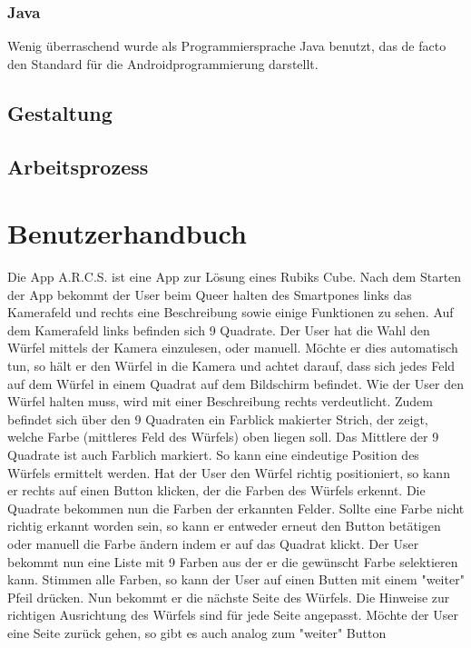 \subsubsection{Java}  %

Wenig überraschend wurde als Programmiersprache Java benutzt, das de facto den
Standard für die Androidprogrammierung darstellt.

\subsection{Gestaltung}  %
\subsection{Arbeitsprozess}  %

\section{Benutzerhandbuch}  %
Die App A.R.C.S. ist eine App zur Lösung eines Rubiks Cube.
Nach dem Starten der App bekommt der User beim Queer halten des Smartpones links das Kamerafeld und rechts
eine Beschreibung sowie einige Funktionen zu sehen. Auf dem Kamerafeld links befinden sich 9 Quadrate.
Der User hat die Wahl den Würfel mittels der Kamera einzulesen, oder manuell. Möchte er dies automatisch tun,
so hält er den Würfel in die Kamera und achtet darauf, dass sich jedes Feld auf dem Würfel in einem Quadrat
auf dem Bildschirm befindet. Wie der User den Würfel halten muss, wird mit einer Beschreibung rechts verdeutlicht.
Zudem befindet sich über den 9 Quadraten ein Farblick makierter Strich, der zeigt, welche Farbe (mittleres Feld
des Würfels) oben liegen soll. Das Mittlere der 9 Quadrate ist auch Farblich markiert. So kann eine eindeutige
Position des Würfels ermittelt werden. Hat der User den Würfel richtig positioniert, so kann er rechts auf einen
Button klicken, der die Farben des Würfels erkennt. Die Quadrate bekommen nun die Farben der erkannten Felder.
Sollte eine Farbe nicht richtig erkannt worden sein, so kann er entweder erneut den Button betätigen oder manuell
die Farbe ändern indem er auf das Quadrat klickt. Der User bekommt nun eine Liste mit 9 Farben aus der er die
gewünscht Farbe selektieren kann. Stimmen alle Farben, so kann der User auf einen Butten mit einem "weiter"
Pfeil drücken. Nun bekommt er die nächste Seite des Würfels. Die Hinweise zur richtigen Ausrichtung des Würfels
sind für jede Seite angepasst. Möchte der User eine Seite zurück gehen, so gibt es auch analog zum "weiter" Button
